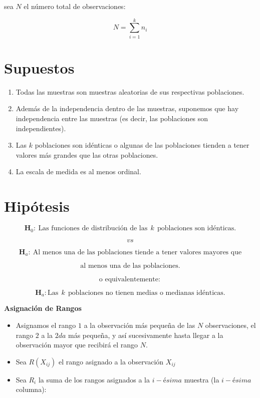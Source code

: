 \documentclass[
  a4paper,
  oneside,
  openany]{book}
\begin{document}
sea \(N\) el número total de observaciones:

\[ N= \sum_{i=1}^{k} n_{i}\]

\hypertarget{supuestos-7}{%
\section{Supuestos}\label{supuestos-7}}

\begin{enumerate}
\def\labelenumi{\arabic{enumi})}
\item
  Todas las muestras son muestras aleatorias de sus respectivas poblaciones.
\item
  Además de la independencia dentro de las muestras, suponemos que hay independencia entre las muestras (es decir, las poblaciones son independientes).
\item
  Las \(k\) poblaciones son idénticas o algunas de las poblaciones tienden a tener valores más grandes que las otras poblaciones.
\item
  La escala de medida es al menos ordinal.
\end{enumerate}

\hypertarget{hipuxf3tesis-6}{%
\section{Hipótesis}\label{hipuxf3tesis-6}}

\[\textbf{H}_0: \ \mbox{Las funciones de distribución de las} \ \  k \ \ \mbox{poblaciones son idénticas.}\]

\[vs\]

\[\textbf{H}_a: \ \mbox{Al menos una de las poblaciones tiende a tener valores mayores que}\]

\[\mbox{al menos una de las poblaciones.}\]

\[\mbox{o equivalentemente}:\]

\[\textbf{H}_a: \mbox{Las} \ \ k \ \  \mbox{poblaciones no tienen medias o medianas idénticas.}\]

\textbf{Asignación de Rangos}

\begin{itemize}
\item
  Asignamos el rango \(1\) a la observación más pequeña de las \(N\) observaciones, el rango \(2\) a la \(2da\) más pequeña, y así sucesivamente hasta llegar a la observación mayor que recibirá el rango \(N\).
\item
  Sea \(R(X_{ij})\) el rango asignado a la observación \(X_{ij}\)
\item
  Sea \(R_{i}\) la suma de los rangos asignados a la \(i-ésima\) muestra (la \(i-ésima\) columna):
\end{itemize}
\end{document}
